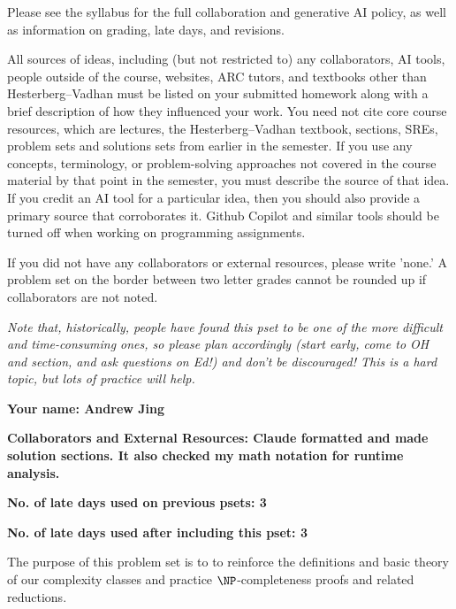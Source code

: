 \documentclass[11pt]{article}
\begin{document}

Please see the syllabus for the full collaboration and generative AI policy, as well as information on grading, late days, and revisions.

All sources of ideas, including (but not restricted to) any collaborators, AI tools, people outside of the course, websites, ARC tutors, and textbooks other than Hesterberg--Vadhan must be listed on your submitted homework along with a brief description of how they influenced your work. You need not cite core course resources, which are lectures, the Hesterberg--Vadhan textbook, sections, SREs, problem sets and solutions sets from earlier in the semester. If you use any concepts, terminology, or problem-solving approaches not covered in the course material by that point in the semester, you must describe the source of that idea. If you credit an AI tool for a particular idea, then you should also provide a primary source that corroborates it. Github Copilot and similar tools should be turned off when working on programming assignments.

If you did not have any collaborators or external resources, please write 'none.' A problem set on the border between two letter grades cannot be rounded up if collaborators are not noted.

\emph{Note that, historically, people have found this pset to be one of the more difficult and time-consuming ones, so please plan accordingly (start early, come to OH and section, and ask questions on Ed!) and don't be discouraged! This is a hard topic, but lots of practice will help.}

\vspace{1em}

\textbf{Your name: Andrew Jing}

\textbf{Collaborators and External Resources: Claude formatted and made solution sections. It also checked my math notation for runtime analysis.}

\textbf{No. of late days used on previous psets: 3}

\textbf{No. of late days used after including this pset: 3}

\vspace{0.2in}

\noindent The purpose of this problem set is to to reinforce the definitions and basic theory of our complexity classes and practice $\NP$-completeness proofs and related reductions. 
\end{document}
